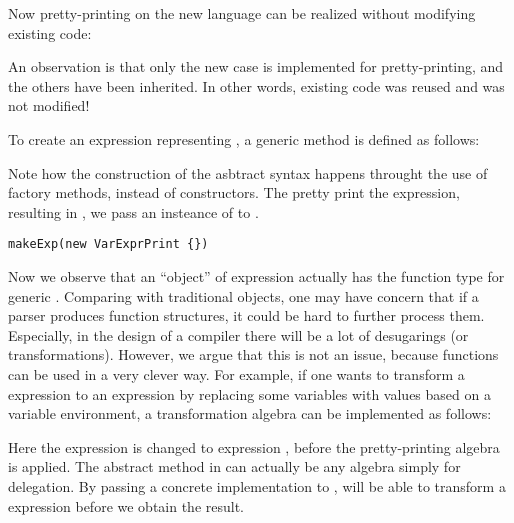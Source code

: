 Now pretty-printing on the new language can be realized without modifying existing code:

An observation is that only the new case is implemented for pretty-printing, and the others have been inherited.
In other words, existing code was reused and was not modified!

To create an expression representing , a generic method is defined as follows:


Note how the construction of the asbtract syntax happens throught 
the use of factory methods, instead of constructors.
The pretty print the expression, resulting in ,
we pass an insteance of  to .

\begin{lstlisting}
makeExp(new VarExprPrint {})
\end{lstlisting}

Now we observe that an ``object'' of expression actually
has the function type   for generic . Comparing with traditional objects, one may have concern that if a parser produces function structures, it could be hard to further process them. Especially, in the design of a compiler
there will be a lot of desugarings (or transformations). However, we argue that this is not an issue, because functions can be used
in a very clever way. For example, if one wants to transform a  expression to an  expression by
replacing some variables with values based on a variable environment, a transformation algebra can be implemented as follows:

Here the  expression  is changed to  expression , before the pretty-printing algebra is applied. The abstract method
 in  can actually be any algebra simply for delegation. By passing a concrete implementation
to ,  will be able to transform a  expression before we obtain the result.

